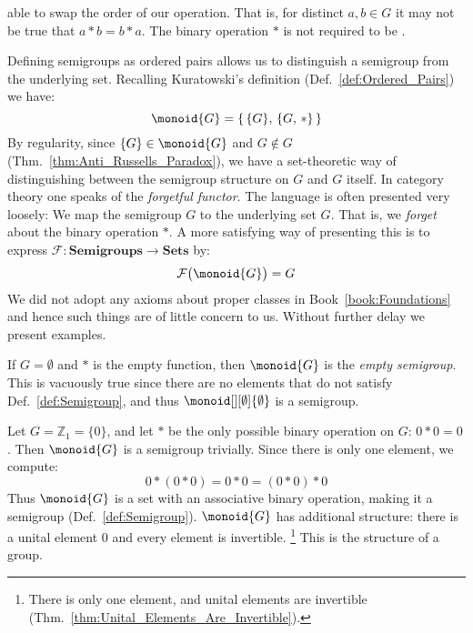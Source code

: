         able to swap the order of our operation. That is, for distinct
        $a,b\in{G}$ it may not be true that $a*b=b*a$. The binary operation $*$
        is not required to be .
        \par\hfill\par
        Defining semigroups as \glspl{ordered pair} allows us to distinguish a
        semigroup from the underlying set. Recalling Kuratowski's definition
        (Def.~\ref{def:Ordered_Pairs}) we have:
        \begin{equation}
            \monoid{G}=\{\,\{G\},\,\{G,\,*\}\,\}
        \end{equation}
        By regularity, since $\{G\}\in\monoid{G}$ and
        $G\notin{G}$ (Thm.~\ref{thm:Anti_Russells_Paradox}), we have a
        set-theoretic way of distinguishing between the semigroup structure on
        $G$ and $G$ itself. In category theory one speaks of the
        \textit{forgetful functor}. The language is
        often presented very loosely: We map the semigroup $G$ to the underlying
        set $G$. That is, we \textit{forget} about the binary operation $*$.
        A more satisfying way of presenting this is to express
        $\mathcal{F}:\mathbf{Semigroups}\rightarrow\mathbf{Sets}$ by:
        \begin{equation}
            \mathcal{F}\big(\monoid{G}\big)=G
        \end{equation}
        We did not adopt any axioms about proper classes in
        Book~\ref{book:Foundations} and hence such things are of little concern
        to us. Without further delay we present examples.
        \begin{example}
            If $G=\emptyset$ and $*$ is the empty function, then $\monoid{G}$ is
            the \textit{empty semigroup}. This
            is vacuously true since there are no elements that do not satisfy
            Def.~\ref{def:Semigroup}, and thus $\monoid[][\emptyset]{\emptyset}$
            is a semigroup.
        \end{example}
        \begin{example}
            Let $G=\mathbb{Z}_{1}=\{0\}$, and let $*$ be the only possible
            binary operation on $G$: $0*0=0$. Then $\monoid{G}$ is a semigroup
            trivially. Since there is only one element, we compute:
            \begin{equation}
                0*(0*0)=0*0=(0*0)*0
            \end{equation}
            Thus $\monoid{G}$ is a set with an associative binary operation,
            making it a semigroup (Def.~\ref{def:Semigroup}). $\monoid{G}$ has
            additional structure: there is a unital element 0 and every element
            is invertible.%
            \footnote{%
                There is only one element, and unital elements are invertible
                (Thm.~\ref{thm:Unital_Elements_Are_Invertible}).
            }
            This is the structure of a group.
        \end{example}
